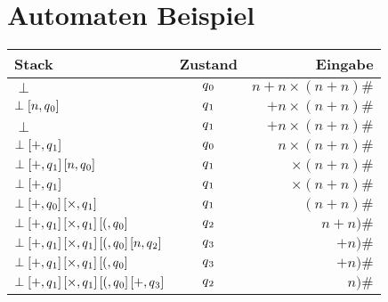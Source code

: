 \documentclass[
10pt,
pantone315, 	%
]{beamer}
\begin{document}
\section{Automaten Beispiel}
\begin{frame}
	\small
	\begin{tabular}{| l | c | r |}
	\hline
	Stack & Zustand & Eingabe \\ \hline
	$\perp$ & $q \textsubscript{0}$ & $ n+n \times (n+n)\#$ \\ \hline
	
	$ \perp\left[n, q\textsubscript{0} \right]$ & $q \textsubscript{1}$ & $+n \times (n+n)\#$ \\ \hline
	
	$\perp$ & $q \textsubscript{1}$ & $ +n \times (n+n)\#$ \\ \hline
	
	$\perp\left[+, q\textsubscript{1} \right]$ & $q \textsubscript{0}$ & $ n \times (n+n)\#$ \\ \hline
	
	$\perp\left[+, q\textsubscript{1} \right] \left[n, q\textsubscript{0} \right]$ 
	& $q \textsubscript{1}$ & $\times (n+n)\#$ \\ \hline
	
	$\perp\left[+, q\textsubscript{1} \right]$ & $q \textsubscript{1}$ & $\times (n+n)\#$ \\ \hline
	
	$\perp\left[+, q\textsubscript{0} \right]\left[\times, q\textsubscript{1} \right]$ 
	& $q \textsubscript{1}$ & $(n+n)\#$ \\ \hline
	
	$\perp\left[+, q\textsubscript{1} \right]\left[\times, q\textsubscript{1} \right] \left[(, q\textsubscript{0} \right]$ 
	& $q \textsubscript{2}$ & $n+n)\#$ \\ \hline
	
	$\perp\left[+, q\textsubscript{1} \right]\left[\times, q\textsubscript{1} \right] \left[(, q\textsubscript{0} \right] \left[n, q\textsubscript{2} \right]$ 
	& $q \textsubscript{3}$ & $+n)\#$ \\ \hline
	
	$\perp\left[+, q\textsubscript{1} \right]\left[\times, q\textsubscript{1} \right] \left[(, q\textsubscript{0} \right]$ 
	& $q \textsubscript{3}$ & $+n)\#$ \\ \hline
	
	$\perp\left[+, q\textsubscript{1} \right]\left[\times, q\textsubscript{1} \right] \left[(, q\textsubscript{0} \right] \left[+, q\textsubscript{3} \right]$ 
	& $q \textsubscript{2}$ & $n)\#$ \\ \hline
	

\end{tabular}
\end{frame}
\end{document}
